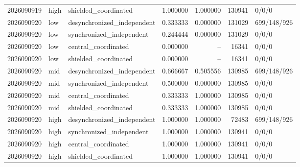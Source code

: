 \begin{longtable}{llp{38mm}rrrp{30mm}}
2026090919 & high & shielded\_coordinated & 1.000000 & 1.000000 & 130941 & 0/0/0 \\
2026090920 & low & desynchronized\_independent & 0.333333 & 0.000000 & 131029 & 699/148/926 \\
2026090920 & low & synchronized\_independent & 0.244444 & 0.000000 & 131029 & 0/0/0 \\
2026090920 & low & central\_coordinated & 0.000000 & -- & 16341 & 0/0/0 \\
2026090920 & low & shielded\_coordinated & 0.000000 & -- & 16341 & 0/0/0 \\
2026090920 & mid & desynchronized\_independent & 0.666667 & 0.505556 & 130985 & 699/148/926 \\
2026090920 & mid & synchronized\_independent & 0.500000 & 0.000000 & 130985 & 0/0/0 \\
2026090920 & mid & central\_coordinated & 0.333333 & 1.000000 & 130985 & 0/0/0 \\
2026090920 & mid & shielded\_coordinated & 0.333333 & 1.000000 & 130985 & 0/0/0 \\
2026090920 & high & desynchronized\_independent & 1.000000 & 1.000000 & 72483 & 699/148/926 \\
2026090920 & high & synchronized\_independent & 1.000000 & 1.000000 & 130941 & 0/0/0 \\
2026090920 & high & central\_coordinated & 1.000000 & 1.000000 & 130941 & 0/0/0 \\
2026090920 & high & shielded\_coordinated & 1.000000 & 1.000000 & 130941 & 0/0/0 \\
\bottomrule
\end{longtable}
